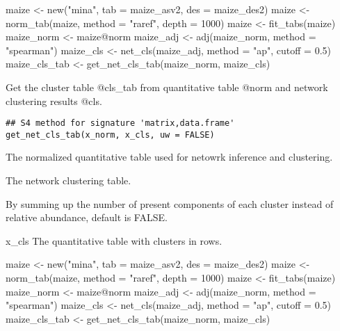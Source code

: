 \documentclass[a4paper]{book}
\begin{document}
%
\begin{Examples}
\begin{ExampleCode}
maize <- new("mina", tab = maize_asv2, des = maize_des2)
maize <- norm_tab(maize, method = "raref", depth = 1000)
maize <- fit_tabs(maize)
maize_norm <- maize@norm
maize_adj <- adj(maize_norm, method = "spearman")
maize_cls <- net_cls(maize_adj, method = "ap", cutoff = 0.5)
maize_cls_tab <- get_net_cls_tab(maize_norm, maize_cls)
\end{ExampleCode}
\end{Examples}
%
\begin{Description}\relax
Get the cluster table @cls\_tab from quantitative table @norm and network
clustering results @cls.
\end{Description}
%
\begin{Usage}
\begin{verbatim}
## S4 method for signature 'matrix,data.frame'
get_net_cls_tab(x_norm, x_cls, uw = FALSE)
\end{verbatim}
\end{Usage}
%
\begin{Arguments}
\begin{ldescription}
\item[\code{x\_norm}] The normalized quantitative table used for netowrk inference
and clustering.

\item[\code{x\_cls}] The network clustering table.

\item[\code{uw}] By summing up the number of present components of each cluster
instead of relative abundance, default is FALSE.
\end{ldescription}
\end{Arguments}
%
\begin{Value}
x\_cls The quantitative table with clusters in rows.
\end{Value}
%
\begin{Examples}
\begin{ExampleCode}
maize <- new("mina", tab = maize_asv2, des = maize_des2)
maize <- norm_tab(maize, method = "raref", depth = 1000)
maize <- fit_tabs(maize)
maize_norm <- maize@norm
maize_adj <- adj(maize_norm, method = "spearman")
maize_cls <- net_cls(maize_adj, method = "ap", cutoff = 0.5)
maize_cls_tab <- get_net_cls_tab(maize_norm, maize_cls)
\end{ExampleCode}
\end{Examples}
\end{document}
